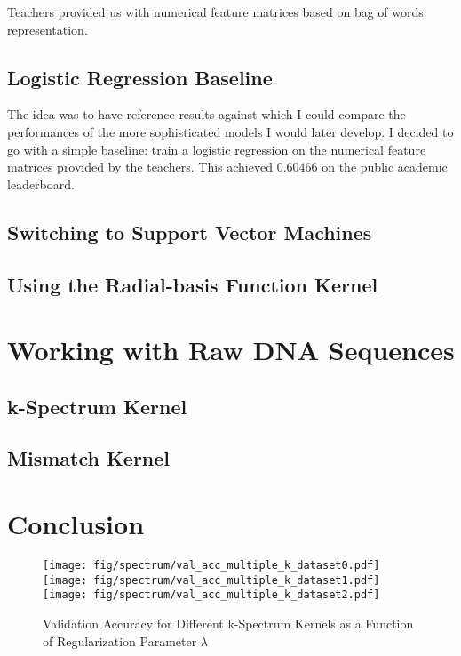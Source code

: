 \documentclass[final]{cvpr}
\begin{document}
	Teachers provided us with numerical feature matrices based on bag of words representation. 
	
	\subsection{Logistic Regression Baseline}
	
	The idea was to have reference results against which I could compare the performances of the more sophisticated models I would later develop. I decided to go with a simple baseline: train a logistic regression on the numerical feature matrices provided by the teachers. This achieved $0.60466$ on the public academic leaderboard.
	
	\subsection{Switching to Support Vector Machines}
		
	
	\subsection{Using the Radial-basis Function Kernel}
	
	\section{Working with Raw DNA Sequences}
	
	\subsection{k-Spectrum Kernel}
	
	\cite{spectrum}
	
	\subsection{Mismatch Kernel}
	
	\cite{mismatch}

	
	\section{Conclusion}
	
	
	{\small
		
		
	}
	
	\clearpage
	
	\begin{figure}[h!]
	\centering
	\texttt{[image: fig/spectrum/val\_acc\_multiple\_k\_dataset0.pdf]}
	\texttt{[image: fig/spectrum/val\_acc\_multiple\_k\_dataset1.pdf]}
	\texttt{[image: fig/spectrum/val\_acc\_multiple\_k\_dataset2.pdf]}
	\caption{\centering Validation Accuracy for Different k-Spectrum Kernels as a Function of Regularization Parameter $\lambda$}
	\label{fig:acc_spectrum}
	\end{figure}
	
\end{document}
